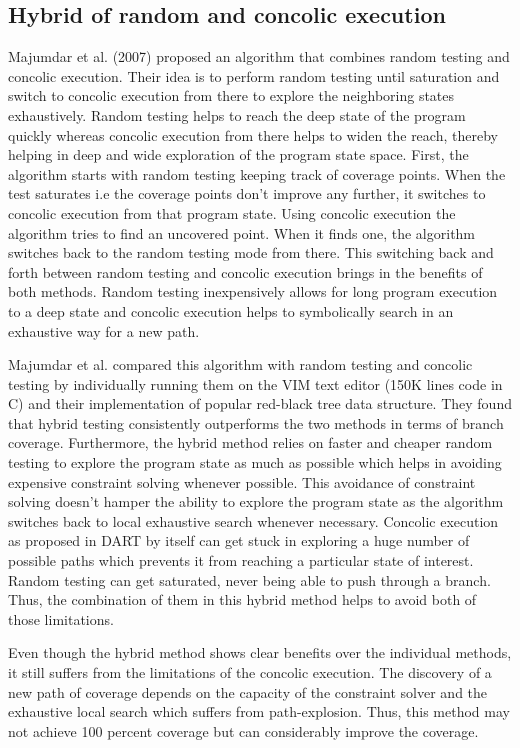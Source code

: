 \documentclass[ runningheads,
               a4paper]{llncs}
\begin{document}


\subsection{Hybrid of random and concolic execution}
Majumdar et al. (2007) \cite{majumdar2007hybrid} proposed an algorithm that combines random testing and concolic execution. Their idea is to perform random testing until saturation and switch to concolic execution from there to explore the neighboring states exhaustively. Random testing helps to reach the deep state of the program quickly whereas concolic execution from there helps to widen the reach, thereby helping in deep and wide exploration of the program state space. First, the algorithm starts with random testing keeping track of coverage points. When the test saturates i.e the coverage points don't improve any further, it switches to concolic execution from that program state. Using concolic execution the algorithm tries to find an uncovered point. When it finds one, the algorithm switches back to the random testing mode from there. This switching back and forth between random testing and concolic execution brings in the benefits of both methods. Random testing inexpensively allows for long program execution to a deep state and concolic execution helps to symbolically search in an exhaustive way for a new path.


Majumdar et al. \cite{majumdar2007hybrid} compared this algorithm with random testing and concolic testing by individually running them on the VIM text editor (150K lines code in C) and their implementation of popular red-black tree data structure. They found that hybrid testing consistently outperforms the two methods in terms of branch coverage. Furthermore, the hybrid method relies on faster and cheaper random testing to explore the program state as much as possible which helps in avoiding expensive constraint solving whenever possible. This avoidance of constraint solving doesn't hamper the ability to explore the program state as the algorithm switches back to local exhaustive search whenever necessary. Concolic execution as proposed in DART \cite{godefroid2005dart} by itself can get stuck in exploring a huge number of possible paths which prevents it from reaching a particular state of interest. Random testing can get saturated, never being able to push through a branch. Thus, the combination of them in this hybrid method helps to avoid both of those limitations.


Even though the hybrid method shows clear benefits over the individual methods, it still suffers from the limitations of the concolic execution. The discovery of a new path of coverage depends on the capacity of the constraint solver and the exhaustive local search which suffers from path-explosion. Thus, this method may not achieve 100 percent coverage but can considerably improve the coverage.
\end{document}
